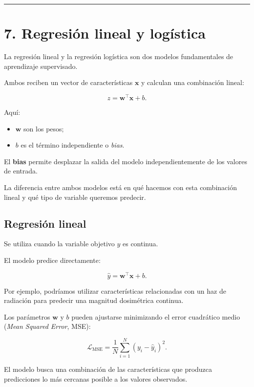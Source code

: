 \documentclass[
  letterpaper,
  DIV=11,
  numbers=noendperiod]{scrartcl}
\providecommand{\tightlist}{%
  \setlength{\itemsep}{0pt}\setlength{\parskip}{0pt}}
\begin{document}
\begin{center}\rule{0.5\linewidth}{0.5pt}\end{center}

\section{7. Regresión lineal y
logística}\label{regresiuxf3n-lineal-y-loguxedstica}

La regresión lineal y la regresión logística son dos modelos
fundamentales de aprendizaje supervisado.

Ambos reciben un vector de características \(\mathbf{x}\) y calculan una
combinación lineal:

\[
z=\mathbf{w}^{\top}\mathbf{x}+b.
\]

Aquí:

\begin{itemize}
\tightlist
\item
  \(\mathbf{w}\) son los pesos;
\item
  \(b\) es el término independiente o \emph{bias}.
\end{itemize}

El \textbf{bias} permite desplazar la salida del modelo
independientemente de los valores de entrada.

La diferencia entre ambos modelos está en qué hacemos con esta
combinación lineal y qué tipo de variable queremos predecir.

\subsection{Regresión lineal}\label{regresiuxf3n-lineal}

Se utiliza cuando la variable objetivo \(y\) es continua.

El modelo predice directamente:

\[
\hat y
=
\mathbf{w}^{\top}\mathbf{x}+b.
\]

Por ejemplo, podríamos utilizar características relacionadas con un haz
de radiación para predecir una magnitud dosimétrica continua.

Los parámetros \(\mathbf{w}\) y \(b\) pueden ajustarse minimizando el
error cuadrático medio (\emph{Mean Squared Error}, MSE):

\[
\mathcal{L}_{\mathrm{MSE}}
=
\frac{1}{N}
\sum_{i=1}^{N}
(y_i-\hat y_i)^2.
\]

El modelo busca una combinación de las características que produzca
predicciones lo más cercanas posible a los valores observados.
\end{document}

